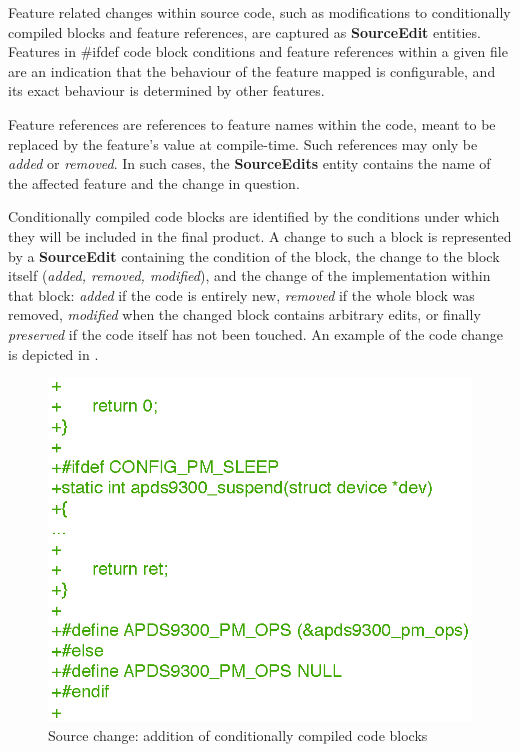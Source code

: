Feature related changes within source code, such as modifications to conditionally compiled blocks and feature references, 
are captured as \textbf{SourceEdit} entities.
Features in \#ifdef code block conditions and feature references within a given file are an indication 
that the behaviour of the feature mapped is configurable, and its exact behaviour is determined by other features.

Feature references are references to feature names within the code, meant to be replaced by the feature's value at compile-time.
Such references may only be \textit{added} or \textit{removed}.
In such cases, the \textbf{SourceEdits} entity contains the name of the affected feature and the change in question.

Conditionally compiled code blocks are identified by the conditions under which they will be included in the final product.
A change to such a block is represented by a \textbf{SourceEdit} containing the condition of the block, 
the change to the block itself (\textit{added, removed, modified}), and the change of the implementation within that block: 
\textit{added} if the code is entirely new, \textit{removed} if the whole block was removed, 
\textit{modified} when the changed block contains arbitrary edits, or finally \textit{preserved} if the code itself has not been touched.
An example of the code change is depicted in .

\begin{figure}[h]
\centering
	\includegraphics[scale=0.5]{Src_Diff_NewBlock.eps}
	\caption{Source change: addition of  conditionally compiled code blocks}
	\label{fig:src_change_diff}
\end{figure}


